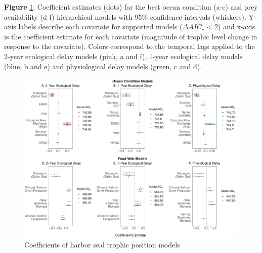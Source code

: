 \documentclass [11pt, proquest] {uwthesis}[2015/03/03]
\begin{document}
\clearpage

\textbf{Figure} \ref{fig:coefsmodel}: Coefficient estimates (dots) for
the best ocean condition (a-c) and prey availability (d-f) hierarchical
models with 95\% confidence intervals (whiskers). Y-axis labels describe
each covariate for supported models (\(\Delta AIC_c\) \textless{} 2) and
x-axis is the coefficient estimate for each covariate (magnitude of
trophic level change in response to the covariate). Colors correspond to
the temporal lags applied to the 2-year ecological delay models (pink, a
and f), 1-year ecological delay models (blue, b and e) and physiological
delay models (green, c and d). \newline 
\begin{figure}[h]
\centering
  \includegraphics[width=0.99\textwidth]{figure/Ch3/Figure2.pdf}
  \caption{Coefficients of harbor seal trophic position models}
  \label{fig:coefsmodel}
\end{figure}
\clearpage
\end{document}
